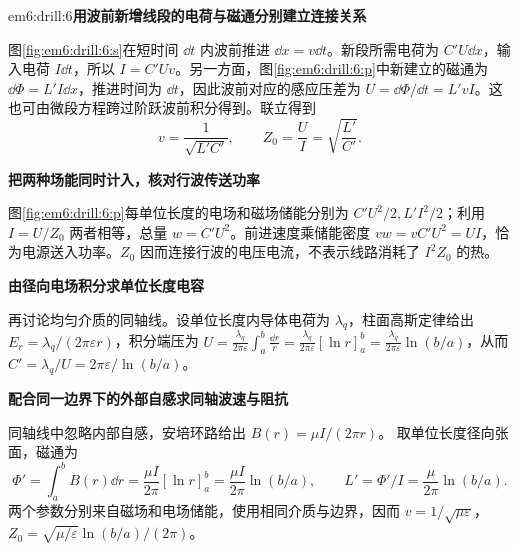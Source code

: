 \begin{drillsolution}{em6:drill:6}\textbf{用波前新增线段的电荷与磁通分别建立连接关系}\par\nobreak
图\ref{fig:em6:drill:6:s}在短时间 $\dd t$ 内波前推进 $\dd x=v\dd t$。新段所需电荷为 $C' U\dd x$，输入电荷 $I\dd t$，所以 $I=C'Uv$。另一方面，图\ref{fig:em6:drill:6:p}中新建立的磁通为 $\dd\Phi=L'I\dd x$，推进时间为 $\dd t$，因此波前对应的感应压差为 $U=\dd\Phi/\dd t=L'vI$。这也可由微段方程跨过阶跃波前积分得到。联立得到
\[v=\frac1{\sqrt{L'C'}},\qquad Z_0=\frac UI=\sqrt{\frac{L'}{C'}}.\]



\par\medskip{}\noindent\textbf{把两种场能同时计入，核对行波传送功率}\par\nobreak
图\ref{fig:em6:drill:6:p}每单位长度的电场和磁场储能分别为 $C'U^2/2,L'I^2/2$；利用 $I=U/Z_0$ 两者相等，总量 $w=C'U^2$。前进速度乘储能密度 $vw=vC'U^2=UI$，恰为电源送入功率。$Z_0$ 因而连接行波的电压电流，不表示线路消耗了 $I^2Z_0$ 的热。



\par\medskip{}\noindent\textbf{由径向电场积分求单位长度电容}\par\nobreak
再讨论均匀介质的同轴线。设单位长度内导体电荷为 $\lambda_q$，柱面高斯定律给出 $E_r=\lambda_q/(2\pi\varepsilon r)$，积分端压为 $U=\frac{\lambda_q}{2\pi\varepsilon}\int_a^b\frac{\dd r}{r}
=\frac{\lambda_q}{2\pi\varepsilon}[\ln r]_a^b
=\frac{\lambda_q}{2\pi\varepsilon}\ln(b/a)$，从而 $C'=\lambda_q/U=2\pi\varepsilon/\ln(b/a)$。

\par\medskip{}\noindent\textbf{配合同一边界下的外部自感求同轴波速与阻抗}\par\nobreak
同轴线中忽略内部自感，安培环路给出 $B(r)=\mu I/(2\pi r)$。
取单位长度径向张面，磁通为
\[
 \Phi'=\int_a^b B(r)\dd r
 =\frac{\mu I}{2\pi}[\ln r]_a^b
 =\frac{\mu I}{2\pi}\ln(b/a),
 \qquad L'=\Phi'/I=\frac{\mu}{2\pi}\ln(b/a).
\]两个参数分别来自磁场和电场储能，使用相同介质与边界，因而 $v=1/\sqrt{\mu\varepsilon}$，$Z_0=\sqrt{\mu/\varepsilon}\ln(b/a)/(2\pi)$。


\end{drillsolution}
